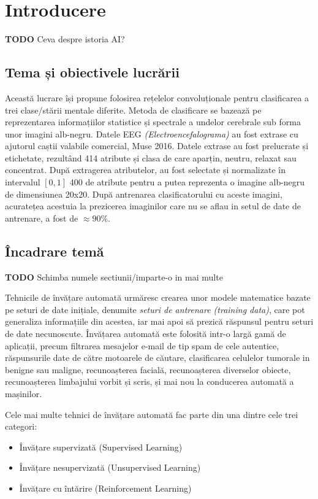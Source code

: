 \chapter{Introducere}\label{ch:1intro}
\textbf{TODO} Ceva despre istoria AI?

\section{Tema și obiectivele lucrării}
Această lucrare își propune folosirea rețelelor convoluționale pentru clasificarea a trei clase/stării mentale diferite. Metoda de clasificare se bazează pe reprezentarea informațiilor statistice și spectrale a undelor cerebrale sub forma unor imagini alb-negru. Datele EEG \textit{(Electroencefalograma)} au fost extrase cu ajutorul caștii valabile comercial, Muse 2016. Datele extrase au fost prelucrate și etichetate, rezultând 414 atribute și clasa de care aparțin, neutru, relaxat sau concentrat. După extragerea atributelor, au fost selectate și normalizate în intervalul $[0,1]$ 400 de atribute pentru a putea reprezenta o imagine alb-negru de dimensiunea 20x20. După antrenarea clasificatorului cu aceste imagini, acuratețea acestuia la prezicerea imaginilor care nu se aflau in setul de date de antrenare, a fost de $\approx90\%$.

\section{Încadrare temă}
\textbf{TODO} Schimba numele sectiunii/imparte-o in mai multe\newline

Tehnicile de învățare automată urmăresc crearea unor modele matematice bazate pe seturi de date inițiale, denumite \textit{seturi de antrenare (training data)}, care pot generaliza informațiile din acestea, iar mai apoi să prezică răspunsul pentru seturi de date necunoscute. Învățarea automată este folosită intr-o largă gamă de aplicații, precum filtrarea mesajelor e-mail de tip spam de cele autentice, răspunsurile date de către motoarele de căutare, clasificarea celulelor tumorale in benigne sau maligne, recunoașterea facială, recunoașterea diverselor obiecte, recunoașterea limbajului vorbit și scris, și mai nou la conducerea automată a mașinilor. 

Cele mai multe tehnici de învățare automată fac parte din una dintre cele trei categori:
\begin{itemize}
	\item Învățare supervizată (Supervised Learning)
	\item Învățare nesupervizată (Unsupervised Learning)
	\item Învățare cu întărire (Reinforcement Learning)
\end{itemize}

